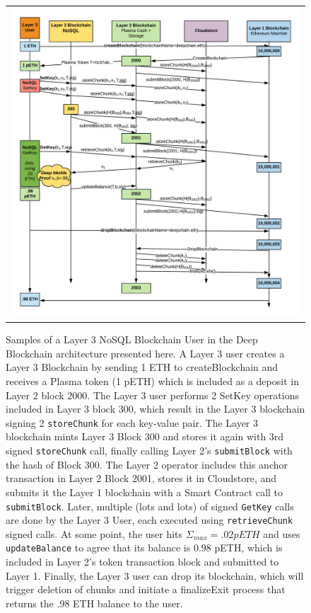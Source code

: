 \documentclass{article}
\begin{document}
\begin{figure}
\begin{tabular}{c}
\centerline{\includegraphics[width=17.5cm]{StateChannel.png}} \\
\end{tabular}
\caption{\small Samples of a Layer 3 NoSQL Blockchain User in the Deep Blockchain architecture presented here.  A Layer 3 user creates a Layer 3 Blockchain by sending 1 ETH to createBlockchain and receives a Plasma token (1 pETH) which is included as a deposit in Layer 2 block 2000.  The Layer 3 user performs 2 SetKey operations included in Layer 3 block 300, which result in the Layer 3 blockchain signing 2 \texttt{storeChunk} for each key-value pair.  The Layer 3 blockchain mints Layer 3 Block 300 and stores it again with 3rd signed \texttt{storeChunk} call, finally calling Layer 2's \texttt{submitBlock} with the hash of Block 300.  The Layer 2 operator includes this anchor transaction in Layer 2 Block 2001, stores it in Cloudstore, and submits it the Layer 1 blockchain with a Smart Contract call to \texttt{submitBlock}.  Later, multiple (lots and lots)  of signed  \texttt{GetKey} calls are done by the Layer 3 User, each executed using \texttt{retrieveChunk} signed calls.  At some point, the user hits $\Sigma_{max}=.02 pETH$ and uses \texttt{updateBalance} to agree that its balance is 0.98 pETH, which is included in Layer 2's token transaction block and submitted to Layer 1.  Finally, the Layer 3 user can drop its blockchain, which will trigger deletion of chunks and initiate a finalizeExit process that returns the .98 ETH balance to the user.}
\centering
\label{statechannel}
\end{figure}
\end{document}
